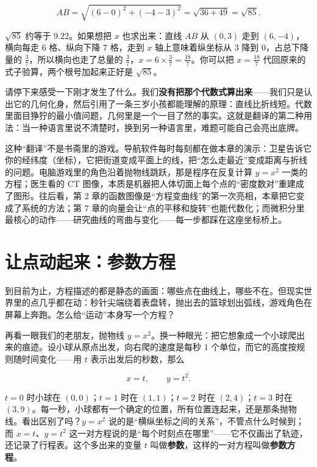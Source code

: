 \[
AB=\sqrt{(6-0)^{2}+(-4-3)^{2}}=\sqrt{36+49}=\sqrt{85}.
\]

$\sqrt{85}$ 约等于 $9.22$。如果想把 $x$ 也求出来：直线 $AB$ 从 $(0,3)$ 走到 $(6,-4)$，横向每走 $6$ 格、纵向下降 $7$ 格，走到 $x$ 轴上意味着纵坐标从 $3$ 降到 $0$，占总下降量的 $\frac{3}{7}$，所以横向也走了总量的 $\frac{3}{7}$，$x=6\times\frac{3}{7}=\frac{18}{7}$。你可以把 $x=\frac{18}{7}$ 代回原来的式子验算，两个根号加起来正好是 $\sqrt{85}$。

请停下来感受一下刚才发生了什么。我们\textbf{没有把那个代数式算出来}——我们只是认出它的几何化身，然后引用了一条三岁小孩都能理解的原理：直线比折线短。代数里面目狰狞的最小值问题，几何里是一个一目了然的事实。这就是翻译的第二种用法：当一种语言里说不清楚时，换到另一种语言里，难题可能自己会亮出底牌。

\begin{lianjie}
这种“翻译”不是书斋里的游戏。导航软件每时每刻都在做本章的演示：卫星告诉它你的经纬度（坐标），它把街道变成平面上的线，把“怎么走最近”变成距离与折线的问题。电脑游戏里的角色沿着抛物线跳跃，那是程序在反复计算 $y=x^{2}$ 一类的方程；医生看的 CT 图像，本质是机器把人体切面上每个点的“密度数对”重建成了图形。往后看，第 2 章的函数图像是“方程变曲线”的第一次亮相，本章把它变成了系统的方法；第 7 章的向量会让“点的平移和旋转”也能代数化；而微积分里最核心的动作——研究曲线的弯曲与变化——每一步都踩在这座坐标桥上。
\end{lianjie}

\section{让点动起来：参数方程}

到目前为止，方程描述的都是静态的画面：哪些点在曲线上，哪些不在。但现实世界里的点几乎都在动：秒针尖端绕着表盘转，抛出去的篮球划出弧线，游戏角色在屏幕上奔跑。怎么给“运动”本身写一个方程？

再看一眼我们的老朋友，抛物线 $y=x^{2}$。换一种眼光：把它想象成一个小球爬出来的痕迹。设小球从原点出发，向右爬的速度是每秒 $1$ 个单位，而它的高度按规则随时间变化——用 $t$ 表示出发后的秒数，那么

\[
x=t,\qquad y=t^{2}.
\]

$t=0$ 时小球在 $(0,0)$；$t=1$ 时在 $(1,1)$；$t=2$ 时在 $(2,4)$；$t=3$ 时在 $(3,9)$。每一秒，小球都有一个确定的位置，所有位置连起来，还是那条抛物线。看出区别了吗？$y=x^{2}$ 说的是“横纵坐标之间的关系”，不管点什么时候到；而 $x=t$、$y=t^{2}$ 这一对方程说的是“每个时刻点在哪里”——它不仅画出了轨迹，还记录了行程表。这个多出来的变量 $t$ 叫做\textbf{参数}，这样的一对方程叫做\textbf{参数方程}。


